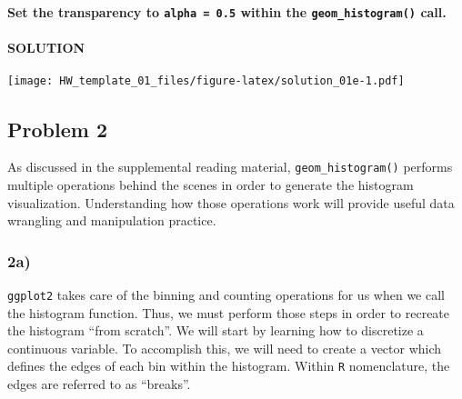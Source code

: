 \documentclass[]{article}
\newenvironment{Shaded}{\begin{snugshade}}{\end{snugshade}}
\newcommand{\DataTypeTok}[1]{\textcolor[rgb]{0.13,0.29,0.53}{#1}}
\newcommand{\DecValTok}[1]{\textcolor[rgb]{0.00,0.00,0.81}{#1}}
\newcommand{\FloatTok}[1]{\textcolor[rgb]{0.00,0.00,0.81}{#1}}
\newcommand{\KeywordTok}[1]{\textcolor[rgb]{0.13,0.29,0.53}{\textbf{#1}}}
\newcommand{\NormalTok}[1]{#1}
\newcommand{\OperatorTok}[1]{\textcolor[rgb]{0.81,0.36,0.00}{\textbf{#1}}}
\newcommand{\StringTok}[1]{\textcolor[rgb]{0.31,0.60,0.02}{#1}}
\let\oldparagraph\paragraph
\renewcommand{\paragraph}[1]{\oldparagraph{#1}\mbox{}}
\begin{document}
\textbf{Set the transparency to \texttt{alpha\ =\ 0.5} within the
\texttt{geom\_histogram()} call.}

\hypertarget{solution-4}{%
\paragraph{SOLUTION}\label{solution-4}}

\begin{Shaded}
\end{Shaded}

\texttt{[image: HW\_template\_01\_files/figure-latex/solution\_01e-1.pdf]}

\hypertarget{problem-2-1}{%
\subsection{Problem 2}\label{problem-2-1}}

As discussed in the supplemental reading material,
\texttt{geom\_histogram()} performs multiple operations behind the
scenes in order to generate the histogram visualization. Understanding
how those operations work will provide useful data wrangling and
manipulation practice.

\hypertarget{a-1}{%
\subsubsection{2a)}\label{a-1}}

\texttt{ggplot2} takes care of the binning and counting operations for
us when we call the histogram function. Thus, we must perform those
steps in order to recreate the histogram ``from scratch''. We will start
by learning how to discretize a continuous variable. To accomplish this,
we will need to create a vector which defines the edges of each bin
within the histogram. Within \texttt{R} nomenclature, the edges are
referred to as ``breaks''.
\end{document}
